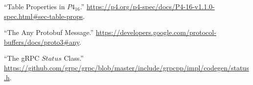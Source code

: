 \documentclass[11pt]{article}
\begin{document}
{{\begin{thebibliography}{35}
\mdbibitemlabel{{}[27]}\textquotedblleft{}Table Properties in $P4_{16}$.\textquotedblright{} \href{https://p4.org/p4-spec/docs/P4-16-v1.1.0-spec.html\%23sec-table-props}{{\ttfamily https://\hspace{0pt}p4.\hspace{0pt}org/\hspace{0pt}p4-\hspace{0pt}spec/\hspace{0pt}docs/\hspace{0pt}P4-\hspace{0pt}16-\hspace{0pt}v1.\hspace{0pt}1.\hspace{0pt}0-\hspace{0pt}spec.\hspace{0pt}html\#\hspace{0pt}sec-\hspace{0pt}table-\hspace{0pt}props}}.\label{p4tableproperties}%

\mdbibitemlabel{{}[28]}\textquotedblleft{}The Any Protobuf Message.\textquotedblright{} \href{https://developers.google.com/protocol-buffers/docs/proto3\%23any}{{\ttfamily https://\hspace{0pt}developers.\hspace{0pt}google.\hspace{0pt}com/\hspace{0pt}protocol-\hspace{0pt}buffers/\hspace{0pt}docs/\hspace{0pt}proto3\#\hspace{0pt}any}}.\label{protoany}%

\mdbibitemlabel{{}[29]}\textquotedblleft{}The gRPC $Status$ Class.\textquotedblright{} \href{https://github.com/grpc/grpc/blob/master/include/grpcpp/impl/codegen/status.h}{{\ttfamily https://\hspace{0pt}github.\hspace{0pt}com/\hspace{0pt}grpc/\hspace{0pt}grpc/\hspace{0pt}blob/\hspace{0pt}master/\hspace{0pt}include/\hspace{0pt}grpcpp/\hspace{0pt}impl/\hspace{0pt}codegen/\hspace{0pt}status.\hspace{0pt}h}}.\label{grpcstatus}%


\end{thebibliography}}}
\end{document}

